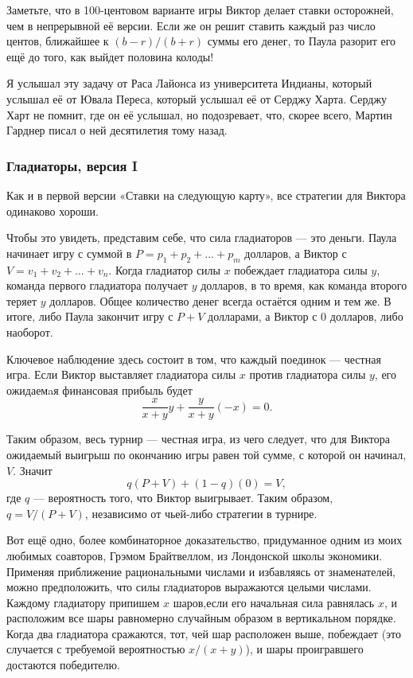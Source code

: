 Заметьте, что в 100-центовом варианте игры Виктор делает ставки осторожней, чем в непрерывной её версии.
Если же он решит ставить каждый раз число центов, ближайшее к $(b - r)/(b + r)$ суммы его денег, то Паула разорит его ещё до того, как выйдет половина колоды!

\medskip

Я услышал эту задачу от Раса Лайонса из университета Индианы, %
который услышал её от Ювала Переса, %
который услышал её от Серджу Харта. %
Серджу Харт не помнит, где он её услышал, но подозревает, что, скорее всего, Мартин Гарднер писал о ней десятилетия тому назад.

\subsubsection*{Гладиаторы, версия I}%

Как и в первой версии «Ставки на следующую карту», все стратегии для Виктора одинаково хороши.

Чтобы это увидеть, представим себе, что сила гладиаторов --- это деньги.
Паула начинает игру с суммой в $P = p_1 + p_2 + \dots + p_m$ долларов, 
а Виктор с $V = v_1 + v_2 + \dots + v_n$.
Когда гладиатор силы $x$ побеждает гладиатора силы $y$, команда первого гладиатора получает $y$ долларов, в то время, как команда второго теряет $y$ долларов.
Общее количество денег всегда остаётся одним и тем же.
В итоге, либо Паула закончит игру с $P+V$ долларами, а Виктор с $0$ долларов, либо наоборот.

Ключевое наблюдение здесь состоит в том, что каждый поединок --- честная игра.
Если Виктор выставляет гладиатора силы $x$ против гладиатора силы $y$, его ожидаемaя финансовая прибыль будет 
\[\frac{x}{x+y}y + \frac{y}{x+y}(-x) =0.\]

Таким образом, весь турнир --- честная игра, из чего следует, что для Виктора ожидаемый выигрыш по окончанию игры равен той сумме, с которой он начинал, $V$.
Значит
\[q(P + V) + (1-q)(0) = V,\]
где $q$ --- вероятность того, что Виктор выигрывает.
Таким образом, $q = V/(P+V)$,
независимо от чьей-либо стратегии в турнире.
\heart

Вот ещё одно, более комбинаторное доказательство, придуманное одним из моих любимых соавторов, Грэмом Брайтвеллом, из Лондонской школы экономики. %
Применяя приближение рациональными числами и избавляясь от знаменателей, можно предположить, что силы гладиаторов выражаются целыми числами.
Каждому гладиатору припишем $x$ шаров,если его начальная сила равнялась $x$, и расположим все шары равномерно случайным образом в вертикальном порядке.
Когда два гладиатора сражаются, тот, чей шар расположен выше, побеждает (это случается с требуемой вероятностью $x/(x+y)$), и шары проигравшего достаются победителю.

